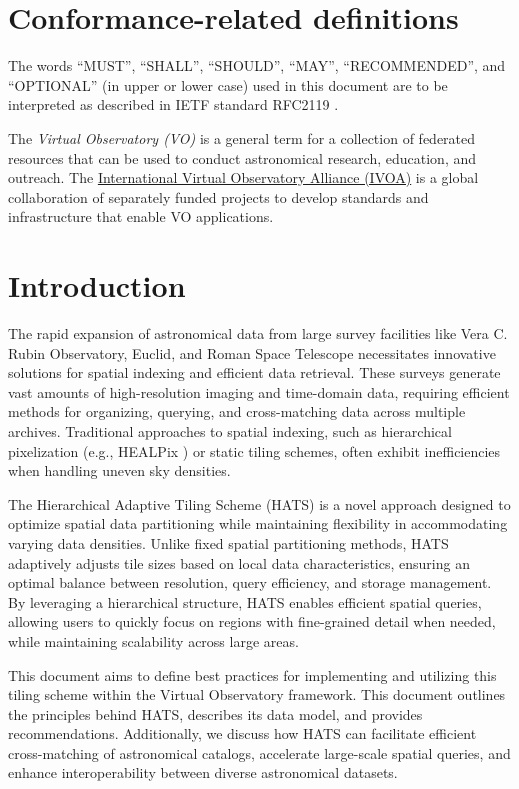 \documentclass[11pt,a4paper]{ivoa}
\begin{document}
\section*{Conformance-related definitions}
The words ``MUST'', ``SHALL'', ``SHOULD'', ``MAY'', ``RECOMMENDED'', and
``OPTIONAL'' (in upper or lower case) used in this document are to be
interpreted as described in IETF standard RFC2119 \citep{std:RFC2119}.

The \emph{Virtual Observatory (VO)} is a
general term for a collection of federated resources that can be used
to conduct astronomical research, education, and outreach.
The \href{https://www.ivoa.net}{International
Virtual Observatory Alliance (IVOA)} is a global
collaboration of separately funded projects to develop standards and
infrastructure that enable VO applications.

\section{Introduction}
The rapid expansion of astronomical data from large survey facilities like Vera C. Rubin Observatory, Euclid, and Roman Space Telescope necessitates innovative solutions for spatial indexing and efficient data retrieval. 
These surveys generate vast amounts of high-resolution imaging and time-domain data, requiring efficient methods for organizing, querying, and cross-matching data across multiple archives. 
Traditional approaches to spatial indexing, such as hierarchical pixelization (e.g., HEALPix  \citep{gorski:healpix}) or static tiling schemes, often exhibit inefficiencies when handling uneven sky densities.

The Hierarchical Adaptive Tiling Scheme (HATS) is a novel approach designed to optimize spatial data partitioning while maintaining flexibility in accommodating varying data densities. 
Unlike fixed spatial partitioning methods, HATS adaptively adjusts tile sizes based on local data characteristics, ensuring an optimal balance between resolution, query efficiency, and storage management. 
By leveraging a hierarchical structure, HATS enables efficient spatial queries, allowing users to quickly focus on regions with fine-grained detail when needed, while maintaining scalability across large areas.

This document aims to define best practices for implementing and utilizing this tiling scheme within the Virtual Observatory framework. 
This document outlines the principles behind HATS, describes its data model, and provides recommendations. 
Additionally, we discuss how HATS can facilitate efficient cross-matching of astronomical catalogs, accelerate large-scale spatial queries, and enhance interoperability between diverse astronomical datasets.
\end{document}
